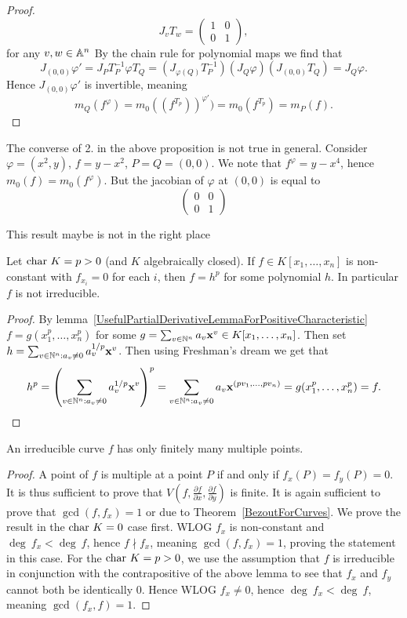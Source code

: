 \begin{proof}
        $$J_{v}T_w=\begin{pmatrix}
            1 & 0 \\
            0 & 1
        \end{pmatrix},$$
         for any $v,w\in \mathbb{A}^n$ By the chain rule for polynomial maps we find that
        $$J_{(0,0)}\varphi' = J_PT_P^{-1}\varphi T_Q = (J_{\varphi(Q)}T_P^{-1})(J_{Q}\varphi)(J_{(0,0)} T_Q) = J_Q\varphi.$$
        Hence $J_{(0,0)} \varphi'$ is invertible, meaning 
        $$m_Q(f^{\varphi}) =m_0((f^{T_p}))^{\varphi'}) = m_0(f^{T_p})=m_P(f).$$
    \end{proof}
    \begin{example}
        The converse of 2. in the above proposition is not true in general. Consider $\varphi=(x^2,y)$, $f=y-x^2$, $P=Q=(0,0)$. We note that $f^{\varphi} = y-x^4$, hence $m_0(f)=m_0(f^\varphi)$. But the jacobian of $\varphi$ at $(0,0)$ is equal to 
        $$\begin{pmatrix}
            0 & 0\\
            0  & 1 
        \end{pmatrix}$$
    \end{example}
    {\Large This result maybe is not in the right place}
    \begin{lemma}\label{PrimeCharacteristicTechnicalMultiplePointLemma}
        Let $\mathrm{char} \ K = p>0$ (and $K$ algebraically closed). If $f\in K[x_1,\dots,x_n]$ is non-constant with $f_{x_i} =0$ for each $i$, then $f = h^p$ for some polynomial $h$. In particular $f$ is not irreducible.
    \end{lemma}
    \begin{proof}
        By lemma~\ref{UsefulPartialDerivativeLemmaForPositiveCharacteristic} $f=g(x_1^p,\dots,x_n^p)$ for some $g= \sum_{v\in \mathbb{N}^n} a_v\mathbf{x}^v\in K[x_1,\dots,x_n]$. Then set $h = \sum_{v\in \mathbb{N}^n : a_v\neq 0} a_v^{1/p} \mathbf{x}^v$. Then using Freshman's dream we get that 
        $$h^p = \left(\sum_{v\in \mathbb{N}^n : a_v\neq 0} a_v^{1/p} \mathbf{x}^v\right)^p = \sum_{v\in \mathbb{N}^n : a_v\neq 0} a_v \mathbf{x}^{(pv_1,\dots,pv_n)} = g(x_1^p,\dots,x_n^p)=f.$$
    \end{proof}
    \begin{proposition}\label{IrreducibleCurveHasFinitelyManyMultiplePoints}
        An irreducible curve $f$ has only finitely many multiple points. 
    \end{proposition}
    \begin{proof}
        A point of $f$ is multiple at a point $P$ if and only if $f_x(P) = f_y(P) = 0.$ It is thus sufficient to prove that $V(f,\frac{\partial f}{\partial x},\frac{\partial f}{\partial y})$ is finite. It is again sufficient to prove that $\gcd(f,f_x)=1$ or  due to Theorem~\ref{BezoutForCurves}. We prove the result in the $\mathrm{char} \ K=0$ case first. WLOG $f_x$ is non-constant and $\deg \ f_x< \deg\ f$, hence $f\nmid f_x$, meaning $\gcd(f,f_x)=1$, proving the statement in this case. For the $\mathrm{char} \ K = p>0$, we use the assumption that $f$ is irreducible in conjunction with the contrapositive of the above lemma to see that $f_x$ and $f_y$ cannot both be identically $0$. Hence WLOG $f_x\neq0$, hence $\deg \ f_x < \deg \ f$, meaning $\gcd(f_x,f)=1$. 
    \end{proof}
